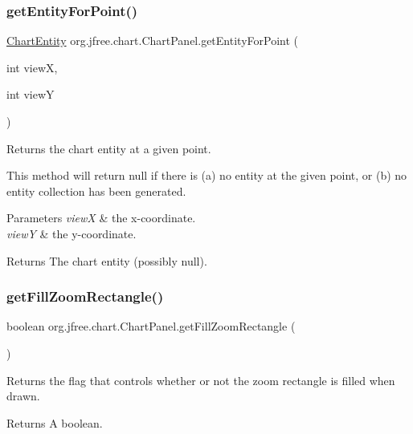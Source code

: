 \subsubsection{\texorpdfstring{get\+Entity\+For\+Point()}{getEntityForPoint()}}
{\footnotesize\ttfamily \mbox{\hyperlink{classorg_1_1jfree_1_1chart_1_1entity_1_1_chart_entity}{Chart\+Entity}} org.\+jfree.\+chart.\+Chart\+Panel.\+get\+Entity\+For\+Point (\begin{DoxyParamCaption}\item[{int}]{viewX,  }\item[{int}]{viewY }\end{DoxyParamCaption})}

Returns the chart entity at a given point. 

This method will return null if there is (a) no entity at the given point, or (b) no entity collection has been generated.


\begin{DoxyParams}{Parameters}
{\em viewX} & the x-\/coordinate. \\
\hline
{\em viewY} & the y-\/coordinate.\\
\hline
\end{DoxyParams}
\begin{DoxyReturn}{Returns}
The chart entity (possibly {\ttfamily null}). 
\end{DoxyReturn}
\mbox{\label{classorg_1_1jfree_1_1chart_1_1_chart_panel_a718c81edc5ae54b6fb8221d6ac05947d}} 
\subsubsection{\texorpdfstring{get\+Fill\+Zoom\+Rectangle()}{getFillZoomRectangle()}}
{\footnotesize\ttfamily boolean org.\+jfree.\+chart.\+Chart\+Panel.\+get\+Fill\+Zoom\+Rectangle (\begin{DoxyParamCaption}{ }\end{DoxyParamCaption})}

Returns the flag that controls whether or not the zoom rectangle is filled when drawn.

\begin{DoxyReturn}{Returns}
A boolean. 
\end{DoxyReturn}
\mbox{\label{classorg_1_1jfree_1_1chart_1_1_chart_panel_a0f4af0deefba27769f017792196c130b}} 
